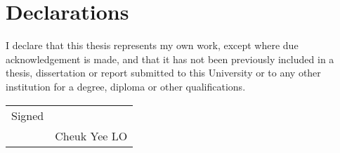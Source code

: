 

\chapter*{Declarations}

I declare that this thesis represents my own work, except where due acknowledgement is made, and that it has not been previously included in a thesis, dissertation or report submitted to this University or to any other institution for a degree, diploma or other qualifications.%

\bigskip
\bigskip
\bigskip
\bigskip
\bigskip
\bigskip
\bigskip
\bigskip

\begin{flushright}
    \begin{tabular}{p{2cm} p{4cm}}
        Signed & \dotfill \\
           & \center Cheuk Yee LO\\
    \end{tabular}
\end{flushright}

\bigskip
\bigskip
\bigskip

